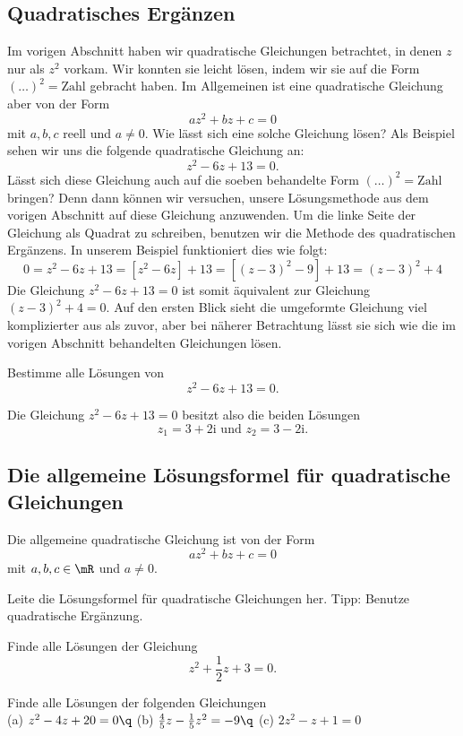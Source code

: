 \documentclass[%
11pt,%
twoside,%
titlepage,%
german,%
headsepline%
]{scrartcl}
\begin{document}
\subsection{Quadratisches Ergänzen}
Im vorigen Abschnitt haben wir quadratische Gleichungen betrachtet, in denen $z$ nur als $z^2$ vorkam. Wir konnten sie leicht l\"osen, indem wir sie auf die Form $(\dots)^2 = \text{Zahl}$ gebracht haben.
Im Allgemeinen ist eine quadratische Gleichung aber von der Form
$$az^2+bz+c = 0$$
mit $a, b, c$ reell und $a\neq 0$. Wie lässt sich eine solche Gleichung l\"osen?
Als Beispiel sehen wir uns die folgende quadratische Gleichung an:
$$z^2 -6z+13=0.$$
Lässt sich diese Gleichung auch auf die soeben behandelte Form $(\dots)^2 = \text{Zahl}$ bringen? Denn dann k\"onnen wir versuchen, unsere L\"osungsmethode aus dem vorigen Abschnitt auf diese Gleichung anzuwenden.
Um die linke Seite der Gleichung als Quadrat zu schreiben, benutzen wir die Methode des quadratischen Ergänzens. In unserem Beispiel funktioniert dies wie folgt:
$$
0=z^2-6z+13=[z^2-6z]+13=[(z-3)^2-9]+13=(z-3)^2+4
$$
Die Gleichung $z^2-6z+13 = 0$ ist somit äquivalent zur Gleichung $(z-3)^2+4 = 0$. Auf den ersten Blick sieht die umgeformte Gleichung viel komplizierter aus als zuvor, aber bei näherer Betrachtung lässt sie sich wie die im vorigen Abschnitt behandelten Gleichungen l\"osen.
\begin{ueb}[ergänzt]
Bestimme alle L\"osungen von
$$z^2-6z+13 = 0.$$
\end{ueb}
\noindent Die Gleichung $z^2 - 6z + 13 = 0$ besitzt also die beiden L\"osungen
$$z_1 =3+2\mathrm{i}\text{ und }z_2 =3-2\mathrm{i}.$$

\subsection{Die allgemeine L\"osungsformel f\"ur quadratische Gleichungen}

Die allgemeine quadratische Gleichung ist von der Form
$$az^2+bz+c=0$$
mit $a,b,c\in\mR$ und $a\neq0$.

\begin{ueb}[Repe]
Leite die L\"osungsformel f\"ur quadratische Gleichungen her. Tipp: Benutze quadratische Ergänzung.
\end{ueb}

\begin{ueb}[zauberformelhaft]
Finde alle L\"osungen der Gleichung
$$z^2+\frac{1}{2}z+3=0.$$
\end{ueb}

\begin{ueb}
Finde alle L\"osungen der folgenden Gleichungen\\[0ex]

(a) $z^2-4z+20=0\q$ (b) $\frac{4}{5}z-\frac{1}{5}z^2=-9\q$ (c) $2z^2-z+1=0$
\end{ueb}
\end{document}
